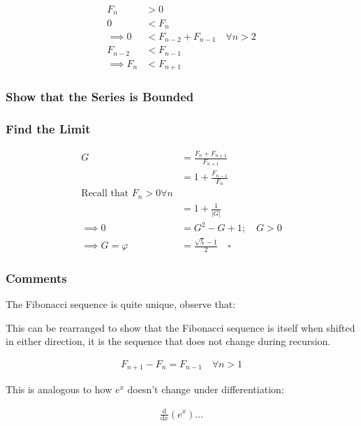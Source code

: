 \documentclass[a4paper,11pt,twoside]{article}
\begin{document}
$$\begin{aligned}
F_{n} &> 0 \\
0 &< F_{n} \\
 \implies   0 &< F_{n - 2} +  F_{n- 1} \quad \forall n > 2 \\
  F_{n- 2} &< F_{n- 1}  \\
   \implies  F_n & < F_{n+1}
\end{aligned}$$



\subsubsection{Show that the Series is Bounded}
\label{sec:org73d213b}
\subsubsection{Find the Limit}
\label{sec:org1e466cb}
$$\begin{aligned}
G &= \frac{F_{n} +  F_{n+  1} }{F_{n+  1} } \\
&= 1 +  \frac{F_{n- 1} }{F_n} \\
\text{Recall that $F_n > 0 \forall n$}\\
&=  1 +  \frac{1}{    \left\lvert G \right\rvert } \\
 \implies  0 &= G^2- G +  1; \quad G > 0  \\
  \implies  G = \varphi &=  \frac{\sqrt{5} - 1  }{2} \quad  \square
\end{aligned}$$


\subsubsection{Comments}
\label{sec:org9dca5dd}

The Fibonacci sequence is quite unique, observe that:

This can be rearranged to show that the Fibonacci sequence is itself
when shifted in either direction, it is the sequence that does not
change during recursion.

\[\begin{aligned}
F_{n+ 1} - F_{n} = F_{n- 1} \quad \forall n > 1
\end{aligned}\]

This is analogous to how \(e^x\) doesn't change under differentiation:

$$\begin{aligned}
\frac{\mathrm{d} }{\mathrm{d} x}\left( e^x \right) \ldots
\end{aligned}$$
\end{document}

